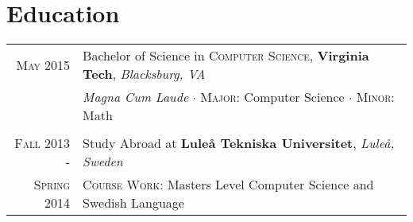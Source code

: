 \documentclass[letterpaper,10pt]{article}
\begin{document}

\section{Education}
\begin{tabular}{R|p{6.2in}}
	\textsc{May} 2015                & Bachelor of Science in \textsc{Computer Science}, \textbf{Virginia Tech}, \emph{Blacksburg, VA}    \\
	                                 & \small\emph{Magna Cum Laude} $\cdot$ \textsc{Major}: Computer Science $\cdot$ \textsc{Minor}: Math \\
	                                                                                                                  \\

	\textsc{Fall} 2013 -             & Study Abroad at \textbf{Luleå Tekniska Universitet}, \emph{Luleå, Sweden}                          \\
	\textsc{Spring} 2014\phantom{ -} & \small\textsc{Course Work}: Masters Level Computer Science and Swedish Language
\end{tabular}
\end{document}
